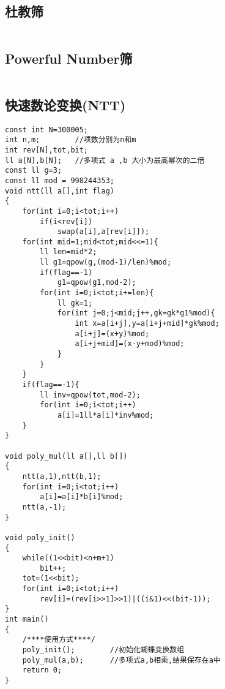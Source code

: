 \documentclass[twocolumn,a4]{article}
\begin{document}
\subsection{杜教筛}
\begin{lstlisting}

\end{lstlisting}

\subsection{Powerful Number筛}
\begin{lstlisting}

\end{lstlisting}

\subsection{快速数论变换(NTT)}
\begin{lstlisting}
const int N=300005;
int n,m;        //项数分别为n和m
int rev[N],tot,bit;
ll a[N],b[N];   //多项式 a ,b 大小为最高幂次的二倍
const ll g=3;
const ll mod = 998244353;
void ntt(ll a[],int flag)
{
    for(int i=0;i<tot;i++)
        if(i<rev[i])
            swap(a[i],a[rev[i]]);
    for(int mid=1;mid<tot;mid<<=1){
        ll len=mid*2;
        ll g1=qpow(g,(mod-1)/len)%mod;
        if(flag==-1)
            g1=qpow(g1,mod-2);
        for(int i=0;i<tot;i+=len){
            ll gk=1;
            for(int j=0;j<mid;j++,gk=gk*g1%mod){
                int x=a[i+j],y=a[i+j+mid]*gk%mod;
                a[i+j]=(x+y)%mod;
                a[i+j+mid]=(x-y+mod)%mod;
            }
        }
    }
    if(flag==-1){
        ll inv=qpow(tot,mod-2);
        for(int i=0;i<tot;i++)
            a[i]=1ll*a[i]*inv%mod;
    }
}

void poly_mul(ll a[],ll b[])
{
    ntt(a,1),ntt(b,1);
    for(int i=0;i<tot;i++)
        a[i]=a[i]*b[i]%mod;
    ntt(a,-1);
}

void poly_init()
{
    while((1<<bit)<n+m+1)
        bit++;
    tot=(1<<bit);
    for(int i=0;i<tot;i++)
        rev[i]=(rev[i>>1]>>1)|((i&1)<<(bit-1));
}
int main()
{
    /****使用方式****/
    poly_init();        //初始化蝴蝶变换数组
    poly_mul(a,b);      //多项式a,b相乘,结果保存在a中
    return 0;
}
\end{lstlisting}
\end{document}
